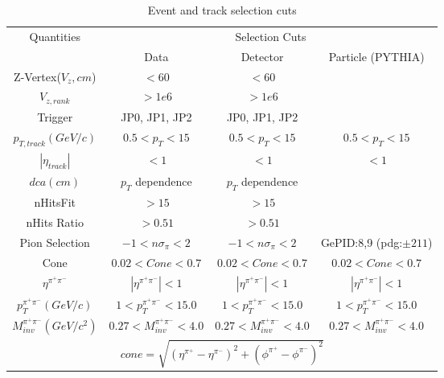 \begin{table}
  	\centering
  	\begin{small}
  	\begin{tabular}{|c|c|c|c|}
  		\hline
  		\multirow{2}{*}{Quantities} &\multicolumn{3}{|c|}{Selection Cuts} \\ 
    
            \cline{2-4}
             & Data & Detector & Particle (PYTHIA) \\
             \hline
  		Z-Vertex($V_z, cm$) & $< 60$&$< 60$&\\
  		\hline
  		$V_{z, rank}$ & $>1e6$&$>1e6$& \\
  		\hline	
  		Trigger & JP0, JP1, JP2&JP0, JP1, JP2& \\
  		\hline
  		$p_{T, track} (GeV/c)$ & $ 0.5<p_T<15$&$0.5<p_T<15$&$0.5<p_T<15$ \\
  		\hline
  		$|\eta_{track}|$ & $< 1$&$< 1$&$< 1$\\
  		\hline
  		$dca (cm)$ & $p_T$ dependence&$p_T$ dependence& \\
  		\hline
  		nHitsFit & $> 15$ &$> 15$&\\
  		\hline
  		nHits Ratio & $> 0.51$ &$> 0.51$& \\
  		\hline	
  		Pion Selection &$-1<n\sigma_\pi<2$ &$-1<n\sigma_\pi<2$&GePID:8,9 (pdg:$\pm 211$)\\
            \hline
            Cone & $0.02<Cone<0.7$ &$0.02<Cone<0.7$&$0.02<Cone<0.7$\\
  		\hline
  		$\eta^{\pi^+\pi^-}$ & $|\eta^{\pi^+\pi^-}|<1$ & $|\eta^{\pi^+\pi^-}|<1$& $|\eta^{\pi^+\pi^-}|<1$\\
  		\hline
  		$p_T^{\pi^+\pi^-} (GeV/c)$ & $1 < p_T^{\pi^+\pi^-} < 15.0$ & $1 < p_T^{\pi^+\pi^-} < 15.0$& $1 < p_T^{\pi^+\pi^-} < 15.0$\\
  		\hline
  		$M_{inv}^{\pi^+\pi^-} (GeV/c^2)$ & $ 0.27 < M_{inv}^{\pi^+\pi^-}< 4.0$ & $ 0.27 < M_{inv}^{\pi^+\pi^-}< 4.0$& $ 0.27 < M_{inv}^{\pi^+\pi^-}< 4.0$\\
  		\hline
  		\multicolumn{4}{|c|}{$cone = \sqrt{(\eta^{\pi^+}-\eta^{\pi^-})^2 + (\phi^{\pi^+} -\phi^{\pi^-})^2}$} \\
  		\hline
  	\end{tabular}
    \end{small}
\caption{Event and track selection cuts}
\label{tab:finalcuts}
\end{table}

